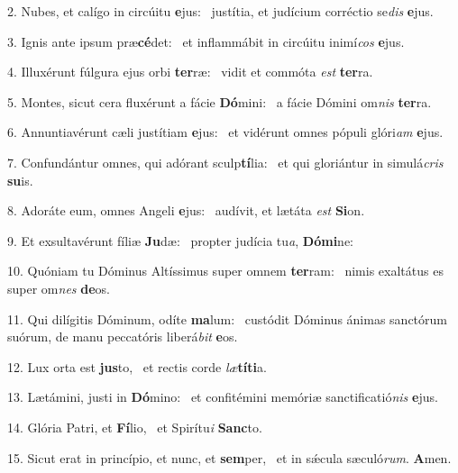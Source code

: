 2. Nubes, et calígo in circúitu \textbf{e}jus: \ast\  justítia, et judícium corréctio se\textit{dis} \textbf{e}jus.\

3. Ignis ante ipsum præ\textbf{cé}det: \ast\  et inflammábit in circúitu inimí\textit{cos} \textbf{e}jus.\

4. Illuxérunt fúlgura ejus orbi \textbf{ter}ræ: \ast\  vidit et commóta \textit{est} \textbf{ter}ra.\

5. Montes, sicut cera fluxérunt a fácie \textbf{Dó}mini: \ast\  a fácie Dómini om\textit{nis} \textbf{ter}ra.\

6. Annuntiavérunt cæli justítiam \textbf{e}jus: \ast\  et vidérunt omnes pópuli glóri\textit{am} \textbf{e}jus.\

7. Confundántur omnes, qui adórant sculp\textbf{tí}lia: \ast\  et qui gloriántur in simulá\textit{cris} \textbf{su}is.\

8. Adoráte eum, omnes Angeli \textbf{e}jus: \ast\  audívit, et lætáta \textit{est} \textbf{Si}on.\

9. Et exsultavérunt fíliæ \textbf{Ju}dæ: \ast\  propter judícia tu\textit{a}, \textbf{Dó}\textbf{mi}ne:\

10. Quóniam tu Dóminus Altíssimus super omnem \textbf{ter}ram: \ast\  nimis exaltátus es super om\textit{nes} \textbf{de}os.\

11. Qui dilígitis Dóminum, odíte \textbf{ma}lum: \ast\  custódit Dóminus ánimas sanctórum suórum, de manu peccatóris liberá\textit{bit} \textbf{e}os.\

12. Lux orta est \textbf{jus}to, \ast\  et rectis corde \textit{læ}\textbf{tí}\textbf{ti}a.\

13. Lætámini, justi in \textbf{Dó}mino: \ast\  et confitémini memóriæ sanctificatió\textit{nis} \textbf{e}jus.\

14. Glória Patri, et \textbf{Fí}lio, \ast\  et Spirítu\textit{i} \textbf{Sanc}to.\

15. Sicut erat in princípio, et nunc, et \textbf{sem}per, \ast\  et in sǽcula sæculó\textit{rum}. \textbf{A}men.\

